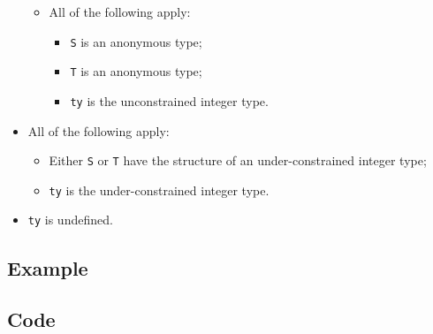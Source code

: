 \documentclass{book}
\begin{document}
\begin{itemize}
\begin{itemize}
      \item All of the following apply:
        \begin{itemize}
        \item \texttt{S} is an anonymous type;
        \item \texttt{T} is an anonymous type;
	\item \texttt{ty} is the unconstrained integer type.
        \end{itemize}
    \end{itemize}

  \item All of the following apply:
    \begin{itemize}
    \item Either \texttt{S} or \texttt{T} have the structure of an under-constrained integer type;
    \item \texttt{ty} is the under-constrained integer type.
    \end{itemize}

  \item \texttt{ty} is undefined.
  \end{itemize}

  \subsection{Example}

  \subsection{Code}
\end{document}
